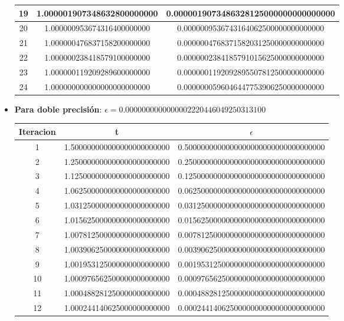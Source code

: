 \documentclass{article}
\begin{document}
\begin{itemize}
\begin{longtable}{|c||c|c|}
		19 & 1.000001907348632800000000 & 0.0000019073486328125000000000000000 \\  \hline
		20 & 1.000000953674316400000000 & 0.0000009536743164062500000000000000 \\  \hline
		21 & 1.000000476837158200000000 & 0.0000004768371582031250000000000000 \\  \hline
		22 & 1.000000238418579100000000 & 0.0000002384185791015625000000000000 \\  \hline
		23 & 1.000000119209289600000000 & 0.0000001192092895507812500000000000 \\  \hline
		24 & 1.000000000000000000000000 & 0.0000000596046447753906250000000000 \\  \hline
	\end{longtable}
	
	\vspace{0.2cm}
	\item \textbf{Para doble precisión}:
	$\epsilon =  0.0000000000000002220446049250313100$ \newline
	\begin{longtable}{|c||c|c|}
		\hline
		Iteracion & t & $\epsilon$ \\ \hline \hline
		1 & 1.500000000000000000000000 & 0.5000000000000000000000000000000000 \\ \hline 
		2 & 1.250000000000000000000000 & 0.2500000000000000000000000000000000 \\ \hline 
		3 & 1.125000000000000000000000 & 0.1250000000000000000000000000000000 \\ \hline 
		4 & 1.062500000000000000000000 & 0.0625000000000000000000000000000000 \\ \hline 
		5 & 1.031250000000000000000000 & 0.0312500000000000000000000000000000 \\ \hline 
		6 & 1.015625000000000000000000 & 0.0156250000000000000000000000000000 \\ \hline 
		7 & 1.007812500000000000000000 & 0.0078125000000000000000000000000000 \\ \hline 
		8 & 1.003906250000000000000000 & 0.0039062500000000000000000000000000 \\ \hline 
		9 & 1.001953125000000000000000 & 0.0019531250000000000000000000000000 \\ \hline 
		10 & 1.000976562500000000000000 & 0.0009765625000000000000000000000000 \\ \hline 
		11 & 1.000488281250000000000000 & 0.0004882812500000000000000000000000 \\ \hline 
		12 & 1.000244140625000000000000 & 0.0002441406250000000000000000000000 \\ \hline 

\end{longtable}
\end{itemize}
\end{document}
